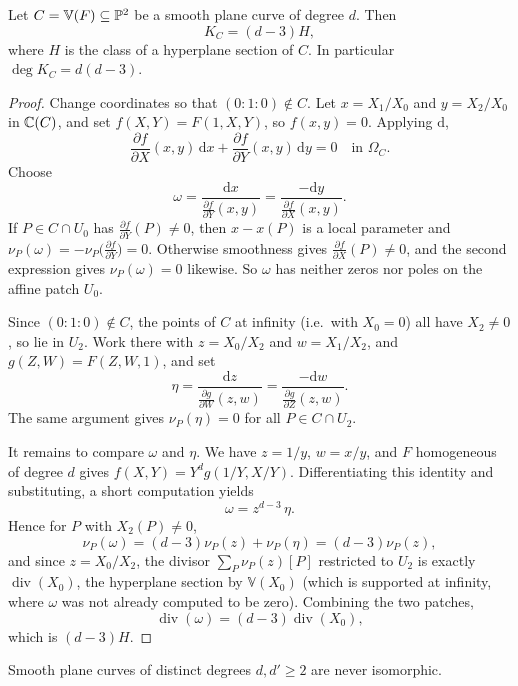 \documentclass[a4paper]{scrartcl}
\newcommand{\V}{\mathbb{V}}
\newcommand{\dee}{\mathrm{d}}
\DeclareMathOperator{\Divv}{div}
\begin{document}
\begin{theorem}\label{thm:canonicalplane}
	Let $C = \V(F)\subseteq\PP^2$ be a smooth plane curve of degree $d$. Then
	$$K_C = (d-3)H,$$
	where $H$ is the class of a hyperplane section of $C$. In particular $\deg K_C = d(d-3)$.
\end{theorem}

\begin{proof}
	Change coordinates so that $(0:1:0)\notin C$. Let $x = X_1/X_0$ and $y = X_2/X_0$ in $\mathbb{C}(C)$, and set $f(X,Y) = F(1,X,Y)$, so $f(x,y) = 0$. Applying $\dee$,
	$$\frac{\partial f}{\partial X}(x,y)\,\dee x + \frac{\partial f}{\partial Y}(x,y)\,\dee y = 0 \quad\text{in }\Omega_C.$$
	Choose
	$$\omega = \frac{\dee x}{\frac{\partial f}{\partial Y}(x,y)} = \frac{-\dee y}{\frac{\partial f}{\partial X}(x,y)}.$$
	If $P \in C\cap U_0$ has $\frac{\partial f}{\partial Y}(P)\neq 0$, then $x - x(P)$ is a local parameter and $\nu_P(\omega) = -\nu_P\big(\frac{\partial f}{\partial Y}\big) = 0$. Otherwise smoothness gives $\frac{\partial f}{\partial X}(P)\neq0$, and the second expression gives $\nu_P(\omega) = 0$ likewise. So $\omega$ has neither zeros nor poles on the affine patch $U_0$.

	Since $(0:1:0)\notin C$, the points of $C$ at infinity (i.e.\ with $X_0 = 0$) all have $X_2 \neq 0$, so lie in $U_2$. Work there with $z = X_0/X_2$ and $w = X_1/X_2$, and $g(Z,W) = F(Z,W,1)$, and set
	$$\eta = \frac{\dee z}{\frac{\partial g}{\partial W}(z,w)} = \frac{-\dee w}{\frac{\partial g}{\partial Z}(z,w)}.$$
	The same argument gives $\nu_P(\eta) = 0$ for all $P \in C\cap U_2$.

	It remains to compare $\omega$ and $\eta$. We have $z = 1/y$, $w = x/y$, and $F$ homogeneous of degree $d$ gives $f(X,Y) = Y^dg(1/Y, X/Y)$. Differentiating this identity and substituting, a short computation yields
	$$\omega = z^{d-3}\,\eta.$$
	Hence for $P$ with $X_2(P)\neq0$,
	$$\nu_P(\omega) = (d-3)\nu_P(z) + \nu_P(\eta) = (d-3)\nu_P(z),$$
	and since $z = X_0/X_2$, the divisor $\sum_P \nu_P(z)[P]$ restricted to $U_2$ is exactly $\Divv(X_0)$, the hyperplane section by $\V(X_0)$ (which is supported at infinity, where $\omega$ was not already computed to be zero). Combining the two patches,
	$$\Divv(\omega) = (d-3)\Divv(X_0),$$
	which is $(d-3)H$.
\end{proof}

\begin{corollary}\label{cor:notiso}
	Smooth plane curves of distinct degrees $d,d'\geq 2$ are never isomorphic.
\end{corollary}
\end{document}
